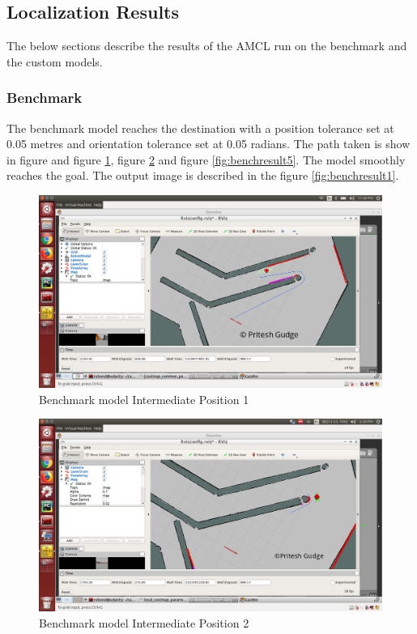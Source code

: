 \documentclass[10pt,journal,compsoc]{IEEEtran}
\begin{document}
\subsection{Localization Results}
The below sections describe the results of the AMCL run on the benchmark and the custom models. 

\subsubsection{Benchmark}
The benchmark model reaches the destination with a position tolerance set at 0.05 metres and orientation tolerance set at 0.05 radians. The path taken is show in figure and figure \ref{fig:benchresult3}, figure \ref{fig:benchresult4} and figure \ref{fig:benchresult5}. The model smoothly reaches the goal.  The output image is described in the figure \ref{fig:benchresult1}.
\begin{figure}[thpb]
      \centering
      \includegraphics[width=\linewidth]{images/28_attempt2goal_mid1_bm}
      \caption{Benchmark model Intermediate Position 1}
      \label{fig:benchresult3}
\end{figure}


\begin{figure}[thpb]
      \centering
      \includegraphics[width=\linewidth]{images/img3_bm}
      \caption{Benchmark model Intermediate Position 2}
      \label{fig:benchresult4}
\end{figure}
\end{document}
